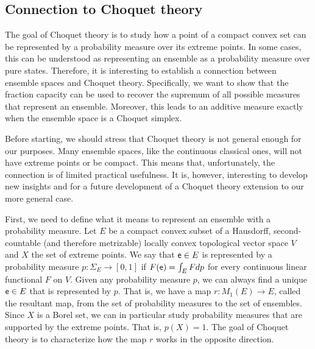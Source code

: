 \subsection{Connection to Choquet theory}

The goal of Choquet theory is to study how a point of a compact convex set can be represented by a probability measure over its extreme points. In some cases, this can be understood as representing an ensemble as a probability measure over pure states. Therefore, it is interesting to establish a connection between ensemble spaces and Choquet theory. Specifically, we want to show that the fraction capacity can be used to recover the supremum of all possible measures that represent an ensemble. Moreover, this leads to an additive measure exactly when the ensemble space is a Choquet simplex.

Before starting, we should stress that Choquet theory is not general enough for our purposes. Many ensemble spaces, like the continuous classical ones, will not have extreme points or be compact. This means that, unfortunately, the connection is of limited practical usefulness. It is, however, interesting to develop new insights and for a future development of a Choquet theory extension to our more general case.

First, we need to define what it means to represent an ensemble with a probability measure. Let $E$ be a compact convex subset of a Hausdorff, second-countable (and therefore metrizable) locally convex topological vector space $V$ and $X$ the set of extreme points. We say that $\mathsf{e} \in E$ is represented by a probability measure $p : \Sigma_{E} \to [0,1]$ if $F(\mathsf{e}) = \int_E F dp$ for every continuous linear functional $F$ on $V$. Given any probability measure $p$, we can always find a unique $\mathsf{e} \in E$ that is represented by $p$. That is, we have a map $r : M_1(E) \to E$, called the resultant map, from the set of probability measures to the set of ensembles. Since $X$ is a Borel set, we can in particular study probability measures that are supported by the extreme points. That is, $p(X) = 1$. The goal of Choquet theory is to characterize how the map  $r$ works in the opposite direction.

